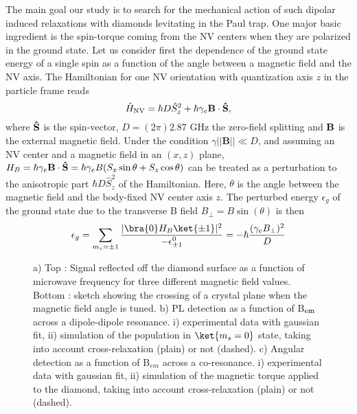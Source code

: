 \documentclass[preprintnumbers,amsmath,amssymb,superscriptaddress,twocolumn,showpacs]{revtex4-1}
\begin{document}
The main goal our study is to search for the mechanical action of such dipolar induced relaxations with diamonds levitating in the Paul trap.
One major basic ingredient is the spin-torque coming from the NV centers when they are polarized in the ground state. 
Let us consider first the dependence of the ground state energy of a single spin as a function of the angle between a magnetic field and the NV axis.
The Hamiltonian for one NV orientation with quantization axis $z$ in the particle frame reads 
\begin{equation}\hat{H}_{\rm NV}=\hbar D \hat{S}_z^2+ \hbar \gamma_e \bf B  \cdot \bf\hat S,
\end{equation}
where $\bf\hat S$ is the spin-vector, $D=(2\pi)2.87$ GHz the zero-field splitting and $\bf B$ is the external magnetic field.
Under the condition $\gamma ||\bm B|| \ll D$, and assuming an NV center and a magnetic field in an $(x,z)$ plane, $H_{B}=  \hbar \gamma_e {\bf B}  \cdot {\bf \hat S}=\hbar\gamma_e B  ( S_x \sin\theta + S_z \cos\theta)$ can be treated as a perturbation to the anisotropic part $\hbar D \hat{S}_z^2$ of the Hamiltonian. Here, $\theta$ is the angle between the magnetic field and the body-fixed NV center axis $z$.
The perturbed energy $\epsilon_g$ of the ground state due to the transverse B field $B_\perp=B \sin(\theta)$ is then
\begin{equation} \epsilon_g=\sum_{m_s=\pm 1}\frac{ |\bra{0} H_B \ket{\pm 1}|^2}{-\epsilon^0_{\pm 1}}=-\hbar\frac{(\gamma_e B_\perp)^2 }{D}
\end{equation}
\begin{figure*}[!ht]
  \centering {}
  \caption{a) Top :  Signal reflected off the diamond surface as a function of microwave frequency for three different magnetic field values. Bottom : sketch showing the crossing of a crystal plane when the magnetic field angle is tuned.
b) PL detection as a function of B$_{\rm em}$ across a dipole-dipole resonance. i) experimental data with gaussian fit, ii) simulation of the population in $\ket{m_s=0}$ state, taking into account cross-relaxation (plain) or not (dashed).
c) Angular detection as a function of B$_{em}$ across a co-resonance. i) experimental data with gaussian fit, ii) simulation of the magnetic torque applied to the diamond, taking into account cross-relaxation (plain) or not (dashed).
  }
  \label{data}
\end{figure*}
\end{document}
